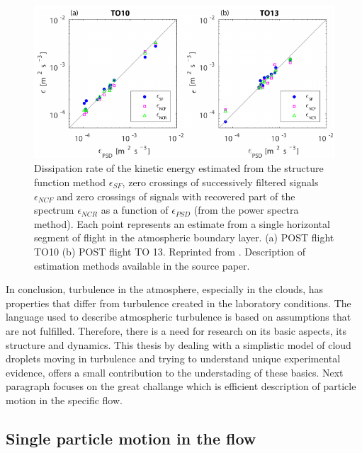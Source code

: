 \documentclass[../main.tex]{subfiles}
\begin{document}
\begin{figure}
\centering
\noindent \includegraphics[width=30pc]{gfx/epsilon_methods_POST.png}
\caption{Dissipation rate of the kinetic energy estimated from the structure function method $\epsilon_{SF}$, zero crossings of successively filtered signals $\epsilon_{NCF}$ and zero crossings of signals with recovered part of the spectrum $\epsilon_{NCR}$ as a function of $\epsilon_{PSD}$ (from the power spectra
method). Each point represents an estimate from a single horizontal segment of flight in the atmospheric boundary layer. (a) POST flight TO10 (b) POST flight TO 13. Reprinted from \citet{Waclawczyk2017}. Description of estimation methods available in the source paper.}
\label{fig:ch1_03}
\end{figure}
In conclusion, turbulence in the atmosphere, especially in the clouds, has properties that differ from turbulence created in the laboratory conditions. The language used to describe atmospheric turbulence is based on assumptions that are not fulfilled. Therefore, there is a need for research on its basic aspects, its structure and dynamics. This thesis by dealing with a simplistic model of cloud droplets moving in turbulence and trying to understand unique experimental evidence, offers a small contribution to the understading of these basics. Next paragraph focuses on the great challange which is efficient description of particle motion in the specific flow.


\subsection{Single particle motion in the flow}
\end{document}
